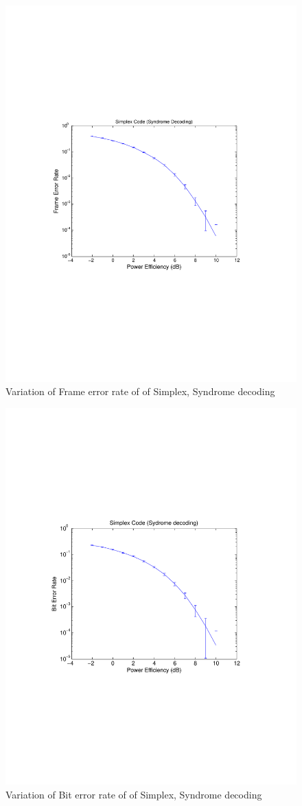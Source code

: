 \documentclass[11pt, english]{article}
\begin{document}
\begin{figure}[H]
    \centering
    \includegraphics[width=.8\textwidth]{simplex_syndrome_decoding_fer.pdf}
    \caption{Variation of Frame error rate of of Simplex, Syndrome decoding }
    \label{sb2}
\end{figure}

\begin{figure}[H]
    \centering
    \includegraphics[width=.8\textwidth]{simplex_syndrome_decoding_ber.pdf}
    \caption{Variation of Bit error rate of of Simplex, Syndrome decoding }
    \label{sb1}
\end{figure}
\end{document}
